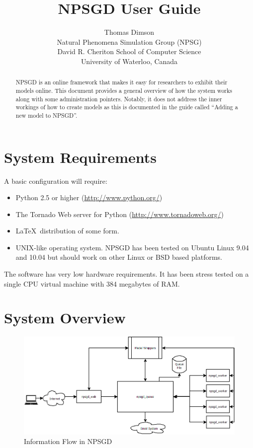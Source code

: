 \documentclass{article}
\title{NPSGD User Guide}
\author{Thomas Dimson\\Natural Phenomena Simulation Group (NPSG)\\David R. Cheriton School of Computer Science\\University of Waterloo, Canada}
\begin{document}
\maketitle
\begin{abstract}
    NPSGD is an online framework that makes it easy for researchers to exhibit
    their models online. This document provides a general overview of how the
    system works along with some administration pointers. Notably, it does
    not address the inner workings of how to create models as this is
    documented in the guide called ``Adding a new model to NPSGD''.
\end{abstract}
\tableofcontents

\section{System Requirements}
\label{sec:requirements}
A basic configuration will require:
\begin{itemize}
    \item Python 2.5 or higher (\url{http://www.python.org/})
    \item The Tornado Web server for Python (\url{http://www.tornadoweb.org/})
    \item \LaTeX\ distribution of some form.
    \item UNIX-like operating system. NPSGD has been tested on Ubuntu Linux 9.04
    and 10.04 but should work on other Linux or BSD based platforms.
\end{itemize}

The software has very low hardware requirements. It has been stress tested on 
a single CPU virtual machine with 384 megabytes of RAM. 

\section{System Overview}

\begin{figure}[ht]
    \centering
    \includegraphics[width=6in]{npsgd_layout.png}
    \caption{Information Flow in NPSGD}
    \label{fig:layout}
\end{figure}
\end{document}

